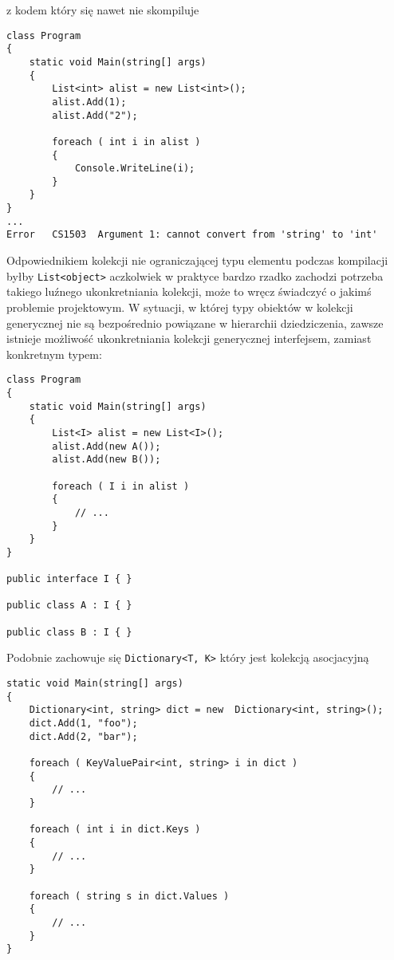 z kodem który się nawet nie skompiluje

\begin{scriptsize}
\begin{verbatim}
class Program
{
    static void Main(string[] args)
    {
        List<int> alist = new List<int>();
        alist.Add(1);
        alist.Add("2");

        foreach ( int i in alist )
        {
            Console.WriteLine(i);
        }
    }
}
...
Error   CS1503  Argument 1: cannot convert from 'string' to 'int'   
\end{verbatim}
\end{scriptsize}

Odpowiednikiem kolekcji nie ograniczającej typu elementu podczas kompilacji byłby {\tt List<object>} aczkolwiek
w praktyce bardzo rzadko zachodzi potrzeba takiego luźnego ukonkretniania kolekcji, może to wręcz świadczyć
o jakimś problemie projektowym. W sytuacji, w której typy obiektów w kolekcji generycznej nie są bezpośrednio powiązane
w hierarchii dziedziczenia, zawsze istnieje możliwość ukonkretniania kolekcji generycznej interfejsem, zamiast konkretnym typem:

\begin{scriptsize}
\begin{verbatim}
class Program
{
    static void Main(string[] args)
    {
        List<I> alist = new List<I>();
        alist.Add(new A());
        alist.Add(new B());

        foreach ( I i in alist )
        {
            // ...
        }
    } 
}

public interface I { }

public class A : I { }

public class B : I { }
\end{verbatim}
\end{scriptsize}

Podobnie zachowuje się {\tt Dictionary<T, K>} który jest kolekcją asocjacyjną

\begin{scriptsize}
\begin{verbatim}
static void Main(string[] args)
{
    Dictionary<int, string> dict = new  Dictionary<int, string>();
    dict.Add(1, "foo");
    dict.Add(2, "bar");

    foreach ( KeyValuePair<int, string> i in dict )
    {
        // ...
    }

    foreach ( int i in dict.Keys )
    {
        // ...
    }

    foreach ( string s in dict.Values )
    {
        // ...
    }
} 
\end{verbatim}
\end{scriptsize}

